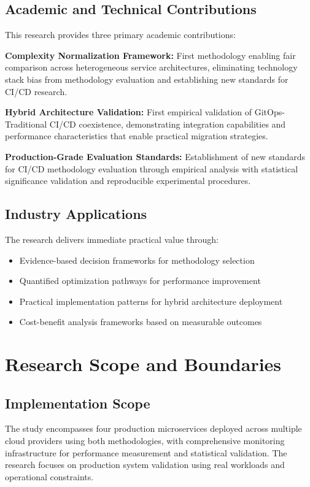 \subsection{Academic and Technical Contributions}
This research provides three primary academic contributions:

\textbf{Complexity Normalization Framework:} First methodology enabling fair comparison across heterogeneous service architectures, eliminating technology stack bias from methodology evaluation and establishing new standards for CI/CD research.

\textbf{Hybrid Architecture Validation:} First empirical validation of GitOps-Traditional CI/CD coexistence, demonstrating integration capabilities and performance characteristics that enable practical migration strategies.

\textbf{Production-Grade Evaluation Standards:} Establishment of new standards for CI/CD methodology evaluation through empirical analysis with statistical significance validation and reproducible experimental procedures.

\subsection{Industry Applications}
The research delivers immediate practical value through:
\begin{itemize}
\item Evidence-based decision frameworks for methodology selection
\item Quantified optimization pathways for performance improvement
\item Practical implementation patterns for hybrid architecture deployment
\item Cost-benefit analysis frameworks based on measurable outcomes
\end{itemize}

\section{Research Scope and Boundaries}

\subsection{Implementation Scope}
The study encompasses four production microservices deployed across multiple cloud providers using both methodologies, with comprehensive monitoring infrastructure for performance measurement and statistical validation. The research focuses on production system validation using real workloads and operational constraints.


